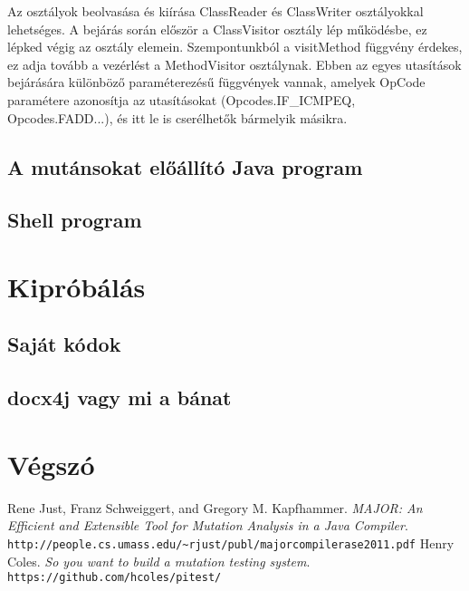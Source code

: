 Az osztályok beolvasása és kiírása ClassReader és ClassWriter osztályokkal lehetséges. A bejárás során először a ClassVisitor osztály lép működésbe, ez lépked végig az osztály elemein. Szempontunkból a visitMethod függvény érdekes, ez adja tovább a vezérlést a MethodVisitor osztálynak. Ebben az egyes utasítások bejárására különböző paraméterezésű függvények vannak, amelyek OpCode paramétere azonosítja az utasításokat (Opcodes.IF\_ICMPEQ, Opcodes.FADD...), és itt le is cserélhetők bármelyik másikra. 
\subsection{A mutánsokat előállító Java program}

\subsection{Shell program}
\section{Kipróbálás}
\subsection{Saját kódok}
\subsection{docx4j vagy mi a bánat}
\section{Végszó}
\begin{thebibliography}{9}
Rene Just, Franz Schweiggert, and Gregory M. Kapfhammer. 
\textit{MAJOR: An Efficient and Extensible Tool for Mutation Analysis in a Java Compiler}. 
\\\texttt{http://people.cs.umass.edu/\textasciitilde rjust/publ/major\textunderscore compiler\textunderscore ase\textunderscore 2011.pdf}
Henry Coles. 
\textit{So you want to build a mutation testing system}. 
\\\texttt{https://github.com/hcoles/pitest/}
\end{thebibliography}
